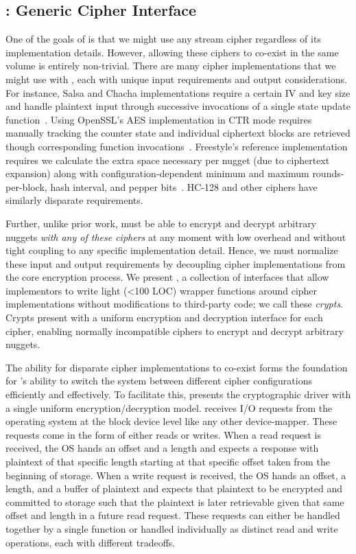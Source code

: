 \subsection{\sysB: Generic Cipher Interface}\label{subsec:des-crypts}

One of the goals of \sys is that we might use any stream cipher regardless of
its implementation details. However, allowing these ciphers to co-exist in the
same volume is entirely non-trivial. There are many cipher implementations that
we might use with \sys, each with unique input requirements and output
considerations. For instance, Salsa and Chacha implementations require a certain
IV and key size and handle plaintext input through successive invocations of a
single state update function~\cite{Floodyberry}. Using OpenSSL's AES
implementation in CTR mode requires manually tracking the counter state and
individual ciphertext blocks are retrieved though corresponding function
invocations~\cite{OpenSSL}. Freestyle's reference implementation requires we
calculate the extra space necessary per nugget (due to ciphertext expansion)
along with configuration-dependent minimum and maximum rounds-per-block, hash
interval, and pepper bits~\cite{Freestyle}. HC-128 and other ciphers have
similarly disparate requirements.

Further, unlike prior work, \sys must be able to encrypt and decrypt arbitrary
nuggets \emph{with any of these ciphers} at any moment with low overhead and
without tight coupling to any specific implementation detail. Hence, we must
normalize these input and output requirements by decoupling cipher
implementations from the core encryption process. We present \sysB, a collection
of interfaces that allow implementors to write light (<100 LOC) wrapper
functions around cipher implementations without modifications to third-party
code; we call these {\em crypts}. Crypts present \sys with a uniform encryption
and decryption interface for each cipher, enabling normally incompatible ciphers
to encrypt and decrypt arbitrary nuggets.

The ability for disparate cipher implementations to co-exist forms the
foundation for \sys's ability to switch the system between different cipher
configurations efficiently and effectively. To facilitate this, \sysB presents
the cryptographic driver with a single uniform encryption/decryption model. \sys
receives I/O requests from the operating system at the block device level like
any other device-mapper. These requests come in the form of either reads or
writes. When a read request is received, the OS hands \sys an offset and a
length and expects a response with plaintext of that specific length starting at
that specific offset taken from the beginning of storage. When a write request
is received, the OS hands \sys an offset, a length, and a buffer of plaintext
and expects that plaintext to be encrypted and committed to storage such that
the plaintext is later retrievable given that same offset and length in a future
read request. These requests can either be handled together by a single function
or handled individually as distinct read and write operations, each with
different tradeoffs.

